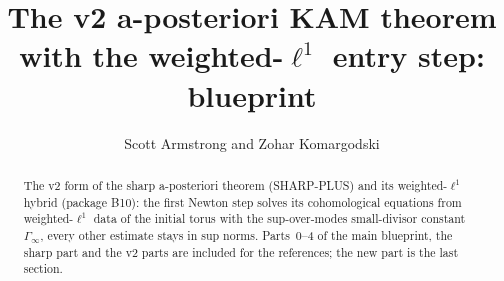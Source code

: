 \documentclass[11pt]{amsart}
\title{The v2 a-posteriori KAM theorem with the weighted-$\ell^1$ entry step: blueprint}
\author{Scott Armstrong and Zohar Komargodski}
\begin{document}
\begin{abstract}
The v2 form of the sharp a-posteriori theorem (SHARP-PLUS) and its weighted-$\ell^1$ hybrid (package B10): the first Newton step solves its
cohomological equations from weighted-$\ell^1$ data of the initial torus with the sup-over-modes small-divisor constant $\Gamma_\infty$, every other
estimate stays in sup norms. Parts~0--4 of the main blueprint, the sharp part and the v2 parts are included for the references; the new part is the
last section.
\end{abstract}
\maketitle
\tableofcontents









\end{document}
